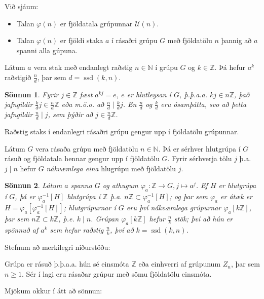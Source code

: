\documentclass[a4paper,icelandic,11pt]{book}
\theoremstyle{plain}
\newtheorem*{sonnun}{Sönnun}
\newcommand{\N}{\mathbb{N}}
\newcommand{\Z}{\mathbb{Z}}
\DeclareMathOperator{\ssd}{ssd} %
\begin{document}
Við sjáum: 
\begin{itemize}
  \item [(1)] Talan $\varphi(n)$ er fjöldatala grúpunnar $\mathcal U(n)$.
  \item [(2)] Talan $\varphi(n)$ er fjöldi staka $a$ í rásaðri grúpu $G$ með
    fjöldatölu $n$ þannig að $a$ spanni alla gúpuna.
\end{itemize}
\begin{setn}
  Látum $a$ vera stak með endanlegt raðstig $n\in \N$ í grúpu $G$ og $k\in \Z$.
  Þá hefur $a^k$ raðstigið $\frac nd$, þar sem $d = \ssd(k,n)$.
\end{setn}
\begin{sonnun}
  Fyrir $j\in \Z$ fæst $a^{kj} = e$, $e$ er hlutleysan í $G$, þ.þ.a.a.
  $kj\in n\Z$, það jafngildir $\frac kd j\in \frac nd \Z$ eða m.ö.o. að
  $\frac nd \mid \frac kd j$. En $\frac nd$ og $\frac kd$ eru ósamþátta, svo að þetta
  jafngildir $\frac nd \mid j$, sem þýðir að $j\in \frac nd \Z$. 
\end{sonnun}
\begin{fylgisetn}
  Raðstig  staks í endanlegri rásaðri grúpu gengur upp í fjöldatölu grúpunnar.
\end{fylgisetn}
\begin{setn}
  Látum $G$ vera rásaða grúpu með fjöldatölu $n\in \N$. Þá er sérhver hlutgrúpa
  í $G$ rásuð og fjöldatala hennar gengur upp í fjöldatölu $G$. Fyrir sérhverja
  tölu $j$ þ.a. $j \mid n$ hefur $G$ \emph{nákvæmlega eina} hlugrúpu með
  fjöldatölu $j$.
\end{setn}
\begin{sonnun}
  Látum $a$ spanna $G$ og athugum $\varphi_a:\Z\to G, j\mapsto a^{j}$. Ef
  $H$ er hlutgrúpa í $G$, þá er $\varphi^{-1}_a[H]$ hlutgrúpa í $\Z$ þ.a.
  $n\Z\subset \varphi^{-1}_a[H]$; og þar sem $\varphi_a$ er átæk er
  $H=\varphi_a[\varphi^{-1}_a[H]]$; hlutgrúpurnar í $G$ eru því nákvæmlega
  grúpurnar $\varphi_a[k\Z]$, þar sem $n\Z\subset k\Z$, þ.e. $k \mid n$. Grúpan
  $\varphi_a[k\Z]$ hefur $\frac nk$ stök; því að hún er spönnuð af $a^k$ sem
  hefur raðstig $\frac nk$, því að $k = \ssd (k,n)$.
\end{sonnun}
Stefnum að merkilegri niðurstöðu:
\begin{setn}
  Grúpa er rásuð þ.þ.a.a. hún sé einsmóta $\Z$ eða einhverri af grúpunum
  $Z_n$, þar sem $n\ge 1$. Sér í lagi eru rásaðar grúpur með sömu fjöldatölu
  einsmóta.
\end{setn}
Mjökum okkur í átt að sönnun:

\end{document}

